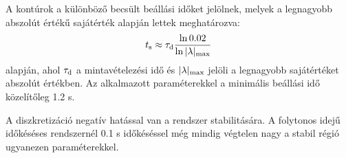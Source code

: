 A kontúrok a különböző becsült beállási időket jelölnek, melyek a legnagyobb abszolút értékű sajátérték 
alapján lettek meghatározva:
\begin{align}
    \begin{split}
        t_{\mathrm{s}} \approx \tau_{\mathrm{d}} \frac{\ln{0.02}}{\ln{|\lambda|_{\mathrm{max}}}}
    \end{split}        
\end{align}
alapján, ahol \(\tau_{\mathrm{d}}\) a mintavételezési idő és \(|\lambda|_{\mathrm{max}}\) jelöli a legnagyobb sajátértéket 
abszolút értékben. Az alkalmazott paraméterekkel a minimális beállási idő közelítőleg 1.2 s. 

A diszkretizáció negatív hatással van a rendszer stabilitására. A folytonos idejű időkéséses rendszernél 0.1 s 
időkéséssel még mindig végtelen nagy a stabil régió ugyanezen paraméterekkel. 